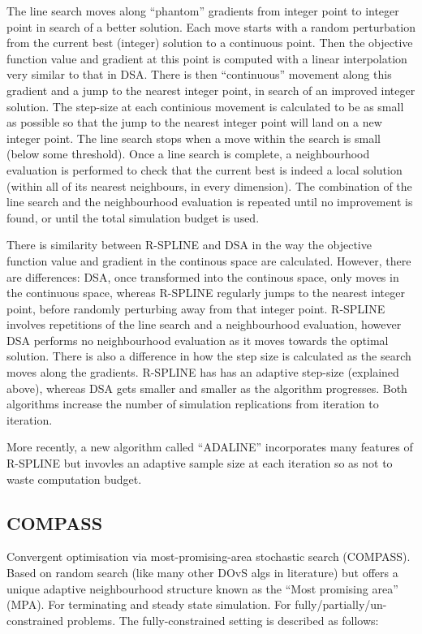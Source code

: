 \message{ !name(SO-Methods.tex)}\documentclass{article}
\begin{document}
The line search moves along ``phantom'' gradients from integer point to integer point in search of a better solution. Each move starts with a random perturbation from the current best (integer) solution to a continuous point. Then the objective function value and gradient at this point is computed with a linear interpolation very similar to that in DSA. There is then ``continuous'' movement along this gradient and a jump to the nearest integer point, in search of an improved integer solution. The step-size at each continious movement is calculated to be as small as possible so that the jump to the nearest integer point will land on a new integer point. The line search stops when a move within the search is small (below some threshold). Once a line search is complete, a neighbourhood evaluation is performed to check that the current best is indeed a local solution (within all of its nearest neighbours, in every dimension). The combination of the line search and the neighbourhood evaluation is repeated until no improvement is found, or until the total simulation budget is used. \newline

There is similarity between R-SPLINE and DSA in the way the objective function value and gradient in the continous space are calculated. However, there are differences: DSA, once transformed into the continous space, only moves in the continuous space, whereas R-SPLINE regularly jumps to the nearest integer point, before randomly perturbing away from that integer point. R-SPLINE involves repetitions of the line search and a neighbourhood evaluation, however DSA performs no neighbourhood evaluation as it moves towards the optimal solution. There is also a difference in how the step size is calculated as the search moves along the gradients. R-SPLINE has has an adaptive step-size (explained above), whereas DSA gets smaller and smaller as the algorithm progresses. Both algorithms increase the number of simulation replications from iteration to iteration. \newline

More recently, a new algorithm called ``ADALINE'' incorporates many features of R-SPLINE but invovles an adaptive sample size at each iteration so as not to waste computation budget. 

\subsection{COMPASS}


Convergent optimisation via most-promising-area stochastic search (COMPASS). Based on random search (like many other DOvS algs in literature) but offers a unique adaptive neighbourhood structure known as the ``Most promising area'' (MPA). For terminating and steady state simulation. For fully/partially/un- constrained problems. The fully-constrained setting is described as follows: \newline
\end{document}
